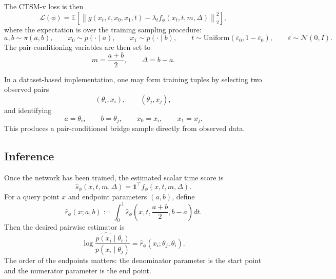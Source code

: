 The CTSM-v loss is then
\begin{equation}
    \mathcal{L}(\phi)
    =
    \mathbb{E}
    \left[
        \left\|
            g(x_t,\varepsilon,x_0,x_1,t)
            -
            \lambda_t f_\phi(x_t,t,m,\Delta)
        \right\|_2^2
    \right],
    \label{eq:ctsmv_loss}
\end{equation}
where the expectation is over the training sampling procedure:
\begin{equation}
    a,b \sim \pi(a,b),
    \qquad
    x_0 \sim p(\cdot\mid a),
    \qquad
    x_1 \sim p(\cdot\mid b),
    \qquad
    t \sim \mathrm{Uniform}(\varepsilon_0,1-\varepsilon_0),
    \qquad
    \varepsilon \sim \mathcal{N}(0,I).
\end{equation}
The pair-conditioning variables are then set to
\begin{equation}
    m = \frac{a+b}{2},
    \qquad
    \Delta = b-a.
\end{equation}

In a dataset-based implementation, one may form training tuples by selecting two observed pairs
\begin{equation}
    (\theta_i,x_i), \qquad (\theta_j,x_j),
\end{equation}
and identifying
\begin{equation}
    a = \theta_i,
    \qquad
    b = \theta_j,
    \qquad
    x_0 = x_i,
    \qquad
    x_1 = x_j.
\end{equation}
This produces a pair-conditioned bridge sample directly from observed data.

\subsection{Inference}
\label{subsec:ctsm-inference}

Once the network has been trained, the estimated scalar time score is
\begin{equation}
    \hat s_\phi(x,t,m,\Delta)
    =
    \mathbf{1}^\top f_\phi(x,t,m,\Delta).
\end{equation}
For a query point $x$ and endpoint parameters $(a,b)$, define
\begin{equation}
    \hat r_\phi(x;a,b)
    :=
    \int_0^1 \hat s_\phi\!\left(x,t,\frac{a+b}{2},b-a\right) dt.
    \label{eq:estimated_ratio}
\end{equation}
Then the desired pairwise estimator is
\begin{equation}
    \widehat{\log \frac{p(x_i\mid \theta_i)}{p(x_i\mid \theta_j)}}
    =
    \hat r_\phi(x_i;\theta_j,\theta_i).
    \label{eq:final_query}
\end{equation}
The order of the endpoints matters: the denominator parameter is the start point and the numerator parameter is the end point.

